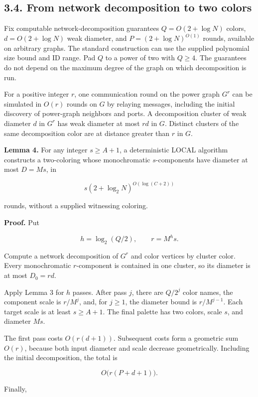 \documentclass[11pt,a4paper]{article}
\begin{document}
\subsection{3.4. From network decomposition to two colors}\label{from-network-decomposition-to-two-colors}

Fix computable network-decomposition guarantees \(Q=O(2+\log N)\) colors, \(d=O(2+\log N)\) weak diameter, and \(P=(2+\log N)^{O(1)}\) rounds, available on arbitrary graphs.
The standard construction can use the supplied polynomial size bound and ID range.
Pad \(Q\) to a power of two with \(Q\ge4\).
The guarantees do not depend on the maximum degree of the graph on which decomposition is run.

For a positive integer \(r\), one communication round on the power graph \(G^r\) can be simulated in \(O(r)\) rounds on \(G\) by relaying messages, including the initial discovery of power-graph neighbors and ports.
A decomposition cluster of weak diameter \(d\) in \(G^r\) has weak diameter at most \(rd\) in \(G\).
Distinct clusters of the same decomposition color are at distance greater than \(r\) in \(G\).

\textbf{Lemma 4.} For any integer \(s\ge A+1\), a deterministic LOCAL algorithm constructs a two-coloring whose monochromatic \(s\)-components have diameter at most \(D=Ms\), in

\[ s(2+\log_2N)^{O(\log(C+2))} \]

rounds, without a supplied witnessing coloring.

\textbf{Proof.} Put

\[ h=\log_2(Q/2),\qquad r=M^hs. \]

Compute a network decomposition of \(G^r\) and color vertices by cluster color.
Every monochromatic \(r\)-component is contained in one cluster, so its diameter is at most \(D_0=rd\).

Apply Lemma 3 for \(h\) passes.
After pass \(j\), there are \(Q/2^j\) color names, the component scale is \(r/M^j\), and, for \(j\ge1\), the diameter bound is \(r/M^{j-1}\).
Each target scale is at least \(s\ge A+1\).
The final palette has two colors, scale \(s\), and diameter \(Ms\).

The first pass costs \(O(r(d+1))\).
Subsequent costs form a geometric sum \(O(r)\), because both input diameter and scale decrease geometrically.
Including the initial decomposition, the total is

\[ O\bigl(r(P+d+1)\bigr). \]

Finally,
\end{document}
